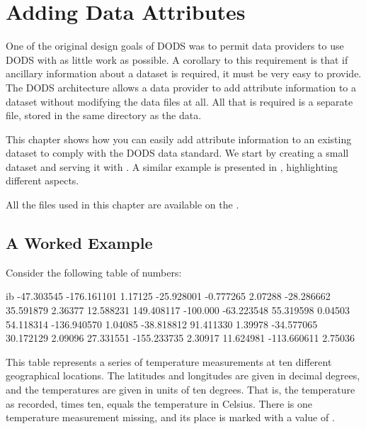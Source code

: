 %
%

%
%
%
%
%

\chapter{Adding Data Attributes}
\label{adding-attr}

One of the original design goals of DODS was to permit data providers
to use DODS with as little work as possible.  A corollary to this
requirement is that if ancillary information about a dataset is
required, it must be very easy to provide.  The DODS architecture
allows a data provider to add attribute information to a dataset
without modifying the data files at all.  All that is required is a
separate file, stored in the same directory as the data.

This chapter shows how you can easily add attribute information to an
existing dataset to comply with the DODS data standard.  We start by
creating a small dataset and serving it with \DODSffs .  A similar
example is presented in \DODSffbook , highlighting different aspects.

All the files used in this chapter are available on the \DODSexamples .

\section{A Worked Example}

Consider the following table of numbers:

\begin{vcode}{ib}
-47.303545 -176.161101  1.17125
-25.928001   -0.777265  2.07288
-28.286662   35.591879  2.36377
 12.588231  149.408117 -100.000
-63.223548   55.319598  0.04503
 54.118314 -136.940570  1.04085
-38.818812   91.411330  1.39978
-34.577065   30.172129  2.09096
 27.331551 -155.233735  2.30917
 11.624981 -113.660611  2.75036
\end{vcode}

This table represents a series of temperature measurements at ten
different geographical locations.  The latitudes and longitudes are
given in decimal degrees, and the temperatures are given in units of
ten degrees.  That is, the temperature as recorded, times ten, equals
the temperature in Celsius.  There is one temperature measurement
missing, and its place is marked with a value of .

